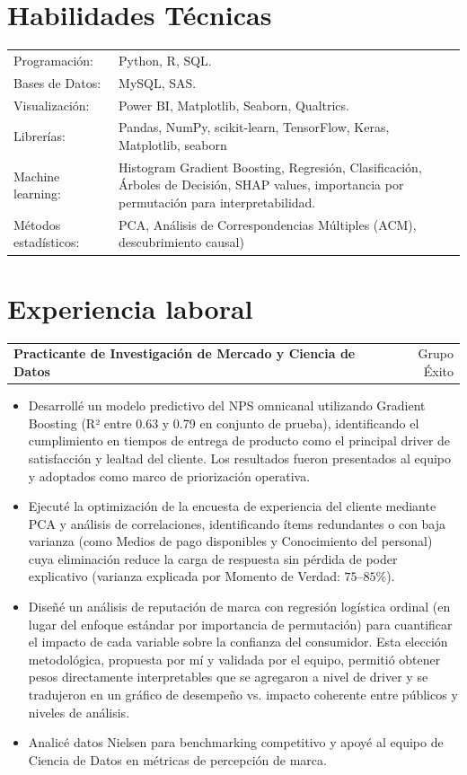 \documentclass[a4paper, 10pt]{article}
\makeatletter
\newenvironment{joblong}[2]
    {
    \begin{tabularx}{\linewidth}{@{}l X r@{}}
    \textbf{#1} & \hfill &  #2 \\[3pt]
    \end{tabularx}
    \begin{minipage}[t]{\linewidth}
    \begin{itemize}[nosep,after=\strut, leftmargin=1em, itemsep=5pt,label=--]
    }
    {
    \end{itemize}
    \end{minipage}    
    }
\makeatother
\begin{document}
\section{Habilidades Técnicas}
\begin{tabularx}{\linewidth}{@{}l X@{}}
Programación:  &  \normalsize{Python, R, SQL.}\\
Bases de Datos:  &  \normalsize{MySQL, SAS.}\\
Visualización:  &  \normalsize{Power BI, Matplotlib, Seaborn, Qualtrics.}\\
Librerías: &  \normalsize{Pandas, NumPy, scikit-learn, TensorFlow, Keras, Matplotlib, seaborn}\\
Machine learning:  &  \normalsize{Histogram Gradient Boosting, Regresión, Clasificación, Árboles de Decisión, SHAP values, importancia por permutación para interpretabilidad.}\\  
Métodos estadísticos:  &  \normalsize{PCA, Análisis de Correspondencias Múltiples (ACM), descubrimiento causal)}\\
\end{tabularx}

\section{Experiencia laboral}

\begin{joblong}{Practicante de Investigación de Mercado y Ciencia de Datos}{Grupo Éxito}

\item Desarrollé un modelo predictivo del NPS omnicanal utilizando Gradient Boosting (R² entre 0.63 y 0.79 en conjunto de prueba), identificando el cumplimiento en tiempos de entrega de producto como el principal driver de satisfacción y lealtad del cliente. Los resultados fueron presentados al equipo y adoptados como marco de priorización operativa.
\item Ejecuté la optimización de la encuesta de experiencia del cliente mediante PCA y análisis de correlaciones, identificando ítems redundantes o con baja varianza (como Medios de pago disponibles y Conocimiento del personal) cuya eliminación reduce la carga de respuesta sin pérdida de poder explicativo (varianza explicada por Momento de Verdad: $75–85\%$).
\item Diseñé un análisis de reputación de marca con regresión logística ordinal (en lugar del enfoque estándar por importancia de permutación) para cuantificar el impacto de cada variable sobre la confianza del consumidor. Esta elección metodológica, propuesta por mí y validada por el equipo, permitió obtener pesos directamente interpretables que se agregaron a nivel de driver y se tradujeron en un gráfico de desempeño vs. impacto coherente entre públicos y niveles de análisis.
\item Analicé datos Nielsen para benchmarking competitivo y apoyé al equipo de Ciencia de Datos en métricas de percepción de marca.
\end{joblong}
  
\end{document}
